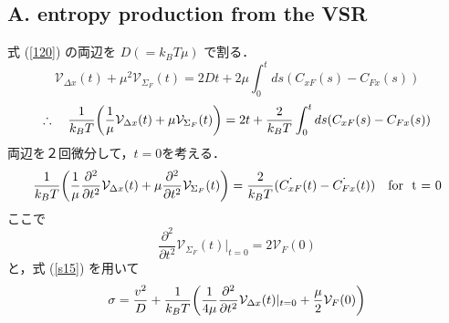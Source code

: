 \documentclass{jsarticle}
\numberwithin{equation}{section}
\theoremstyle{definition}
\begin{document}
\subsection{A. entropy production from the VSR}
式 (\ref{120}) の両辺を $D( =k_B T \mu )$ で割る．
\begin{equation}
  \mathcal{V} _{\Delta x} (t) + \mu^2 \mathcal{V} _{\Sigma_F} (t) = 2Dt + 2\mu \int_0^t ds ( C_{xF} (s) - C_{Fx} (s) )
\end{equation}
\begin{equation}
  \therefore \quad \frac{1}{k_B T} \qty( \frac{1}{\mu} \mathcal{V} _{\Delta x} (t) + \mu \mathcal{V} _{\Sigma_F} (t)) = 2t + \frac{2}{k_B T} \int_0^t ds ( C_{xF} (s) - C_{Fx} (s) )
\end{equation}
両辺を２回微分して，$t=0$を考える．
\begin{equation}
  \frac{1}{k_B T} \qty( \frac{1}{\mu} \frac{\partial^2}{\partial t^2} \mathcal{V} _{\Delta x} (t) + \mu \frac{\partial^2}{\partial t^2} \mathcal{V} _{\Sigma_F} (t)) = \frac{2}{k_B T} ( \dot{C_{xF}} (t) - \dot{C_{Fx}} (t) ) \quad \text{for \ t = 0}
\end{equation}
ここで
\begin{equation}
  \frac{\partial^2}{\partial t^2} \mathcal{V} _{\Sigma_F} (t)|_{t = 0} = 2 \mathcal{V}_F (0)
\end{equation}
と，式 (\ref{s15}) を用いて 
\begin{equation}
  \sigma = \frac{v^2}{D} + \frac{1}{k_B T} \qty( \frac{1}{4 \mu } \frac{\partial^2}{\partial t^2} \mathcal{V} _{\Delta x} (t)|_{t = 0} + \frac{\mu }{2} \mathcal{V}_F (0) )
\end{equation}
\end{document}
